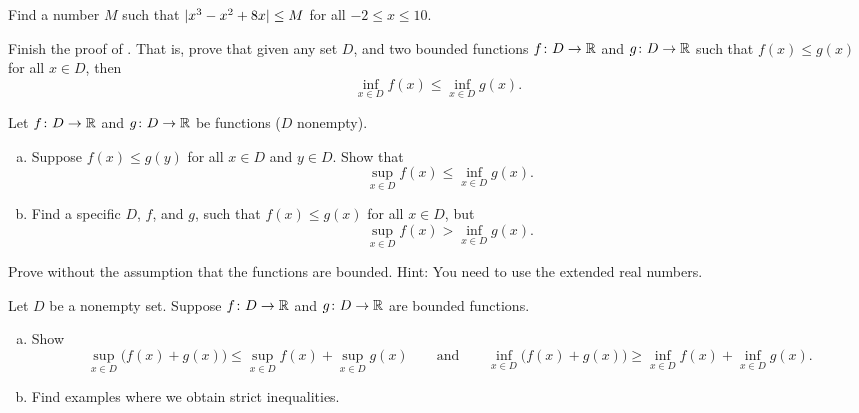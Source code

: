 \begin{exercise}
Find a number $M$ such that $\lvert {x^3-x^2+8x} \rvert \leq M$ for all $-2 \leq x \leq
10$.
\end{exercise}

\begin{exercise} \label{exercise:finishfuncsupinf}
Finish the proof of .
That is, prove that
given any set $D$,
and two bounded functions
$f \colon D \to {\mathbb{R}}$ and $g \colon D \to {\mathbb{R}}$ 
such that $f(x) \leq g(x)$ for all $x \in D$, then 
\begin{equation*}
\inf_{x\in D} f(x) \leq \inf_{x\in D} g(x) .
\end{equation*}
\end{exercise}

\begin{exercise} \label{exercise:supinffuncineq}
Let 
$f \colon D \to {\mathbb{R}}$ and $g \colon D \to {\mathbb{R}}$ be functions ($D$ nonempty).
\begin{enumerate}[a)]
%
\item
Suppose 
$f(x) \leq g(y)$ for all $x \in D$ and $y \in D$.  Show that
\begin{equation*}
\sup_{x\in D} f(x) \leq \inf_{x\in D} g(x) .
\end{equation*}
%
\item
Find a specific $D$, $f$, and $g$, such that
$f(x) \leq g(x)$ for all $x \in D$, but
\begin{equation*}
\sup_{x\in D} f(x) > \inf_{x\in D} g(x) .
\end{equation*}
\end{enumerate}
\end{exercise}

\begin{exercise}
Prove  without the assumption that
the functions are bounded.  Hint: You need to use the extended real
numbers.
\end{exercise}

\begin{exercise} \label{exercise:sumofsup}
Let $D$ be a nonempty set.
Suppose $f \colon D \to {\mathbb{R}}$ and $g \colon D \to {\mathbb{R}}$ are bounded functions.
\begin{enumerate}[a)]
\item
Show 
\begin{equation*}
\sup_{x\in D} \bigl(f(x) + g(x) \bigr) \leq
\sup_{x\in D} f(x)
+
\sup_{x\in D} g(x)
\qquad \text{and} \qquad
\inf_{x\in D} \bigl(f(x) + g(x) \bigr) \geq
\inf_{x\in D} f(x)
+
\inf_{x\in D} g(x) .
\end{equation*}
\item
Find examples where we obtain strict inequalities.
\end{enumerate}
\end{exercise}

